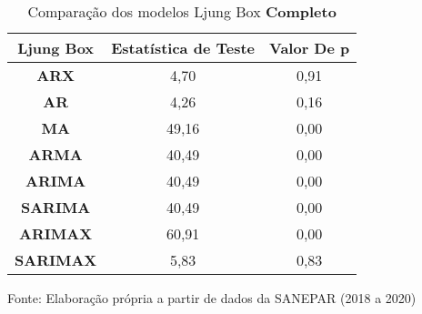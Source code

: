 \begin{table}[H]
	\centering
	\caption{Comparação dos modelos Ljung Box \textbf{Completo} }\label{tb:lbcm}
	\begin{tabular}{@{}ccc@{}}
		\toprule
		\textbf{Ljung Box} & \textbf{Estatística de Teste} & \textbf{Valor De p} \\ \midrule
\textbf{ARX}       & 4,70                          & 0,91                \\
\textbf{AR}        & 4,26                          & 0,16                \\
\textbf{MA}        & 49,16                         & 0,00                \\
\textbf{ARMA}      & 40,49                         & 0,00                \\
\textbf{ARIMA}     & 40,49                         & 0,00                \\
\textbf{SARIMA}    & 40,49                         & 0,00                \\
\textbf{ARIMAX}    & 60,91                         & 0,00                \\
\textbf{SARIMAX}   & 5,83                          & 0,83                \\ \bottomrule
	\end{tabular}

	
	Fonte: Elaboração própria a partir de dados da SANEPAR (2018 a 2020)
\end{table}

